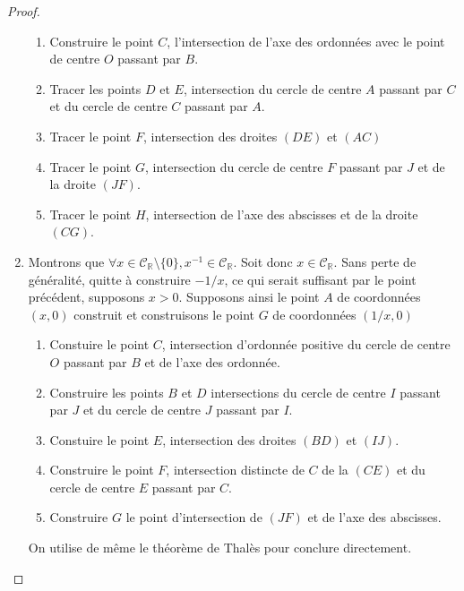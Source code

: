 \documentclass[a4paper,12pt,french]{report}
\begin{document}
\begin{proof}
\begin{enumerate}
						\begin{enumerate}
							\item Construire le point $C$, l'intersection de l'axe des ordonnées avec le point de centre $O$ passant par $B$.
							\item Tracer les points $D$ et $E$, intersection du cercle de centre $A$ passant par $C$ et du cercle de centre $C$ passant par $A$.
							\item Tracer le point $F$, intersection des droites $(DE)$ et $(AC)$
							\item Tracer le point $G$, intersection du cercle de centre $F$ passant par $J$ et de la droite $(JF)$.
							\item Tracer le point $H$, intersection de l'axe des abscisses et de la droite $(CG)$.
						\end{enumerate}
						
					\item Montrons que \( \forall x \in \mathscr{C}_\mathbb{R}\setminus \{0\}, x^{-1} \in \mathscr{C}_\mathbb{R} \). Soit donc $x \in \mathscr{C}_\mathbb{R}$. Sans perte de généralité, quitte à construire $-1/x$, ce qui serait suffisant par le point précédent, supposons $x > 0$. Supposons ainsi le point $A$ de coordonnées $(x, 0)$ construit et construisons le point $G$ de coordonnées $(1/x, 0)$
					\begin{enumerate}
						\item Constuire le point $C$, intersection d'ordonnée positive du cercle de centre $O$ passant par $B$ et de l'axe des ordonnée.
						\item Construire les points $B$ et $D$ intersections du cercle de centre $I$ passant par $J$ et du cercle de centre $J$ passant par $I$.
						\item Constuire le point $E$, intersection des droites $(BD)$ et $(IJ)$.
						\item Construire le point $F$, intersection distincte de $C$ de la $(CE)$ et du cercle de centre $E$ passant par $C$.
						\item Construire $G$ le point d'intersection de $(JF)$ et de l'axe des abscisses.
					\end{enumerate}
					On utilise de même le théorème de Thalès pour conclure directement.
							
				\end{enumerate}
			\end{proof}
		
\end{document}
